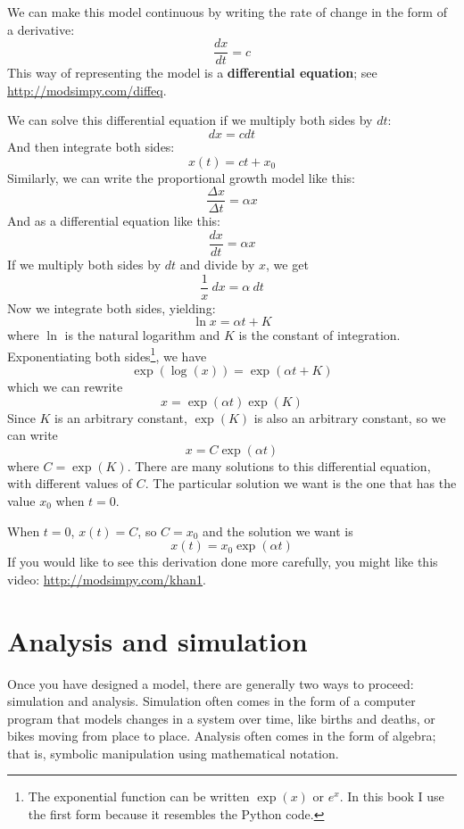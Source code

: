\documentclass[12pt]{book}
\theoremstyle{exercise}
\begin{document}

We can make this model continuous by writing the rate of change in the form of a derivative:
%
\[ \frac{dx}{dt} = c \]
%
This way of representing the model is a {\bf differential equation}; see \url{http://modsimpy.com/diffeq}.


We can solve this differential equation if we multiply both sides by $dt$:
%
\[ dx = c dt \]
%
And then integrate both sides:
%
\[ x(t) = c t + x_0 \]
%
Similarly, we can write the proportional growth model like this:
%
\[ \frac{\Delta x}{\Delta t} = \alpha x \]
%
And as a differential equation like this:
%
\[ \frac{dx}{dt} = \alpha x \]
%
If we multiply both sides by $dt$ and divide by $x$, we get
%
\[ \frac{1}{x}~dx = \alpha~dt \] 
%
Now we integrate both sides, yielding:
%
\[ \ln x = \alpha t + K \]
%
where $\ln$ is the natural logarithm and $K$ is the constant of integration.  Exponentiating both sides\footnote{The exponential function can be written $\exp(x)$ or $e^x$.  In this book I use the first form because it resembles the Python code. }, we have
%
\[ \exp(\log(x)) = \exp(\alpha t + K) \]
%
which we can rewrite
%
\[ x = \exp(\alpha t) \exp(K) \]
%
Since $K$ is an arbitrary constant, $\exp(K)$ is also an arbitrary constant, so we can write
%
\[ x = C \exp(\alpha t) \]
%
where $C = \exp(K)$.  There are many solutions to this differential equation, with different values of $C$.  The particular solution we want is the one that has the value $x_0$ when $t=0$. 

When $t=0$, $x(t) = C$, so $C = x_0$ and the solution we want is
%
\[ x(t) = x_0 \exp(\alpha t) \]
%
If you would like to see this derivation done more carefully, you might like this video: \url{http://modsimpy.com/khan1}.



\section{Analysis and simulation}

Once you have designed a model, there are generally two ways to proceed: simulation and analysis.  Simulation often comes in the form of a computer program that models changes in a system over time, like births and deaths, or bikes moving from place to place.  Analysis often comes in the form of algebra; that is, symbolic manipulation using mathematical notation.
\end{document}
